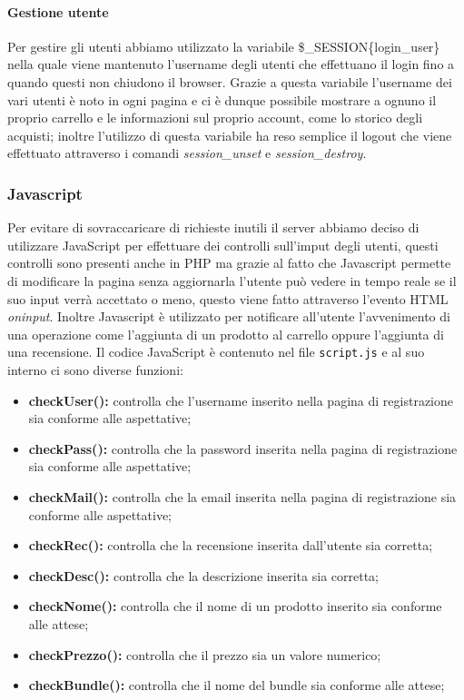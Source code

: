 \paragraph{Gestione utente} \Spazio
Per gestire gli utenti abbiamo utilizzato la variabile \$\_SESSION\{login\_user\} nella quale viene mantenuto l'username degli utenti che effettuano il login fino a quando questi non chiudono il browser.\newline
Grazie a questa variabile l'username dei vari utenti è noto in ogni pagina e ci è dunque possibile mostrare a ognuno il proprio carrello e le informazioni sul proprio account, come lo storico degli acquisti;
inoltre l'utilizzo di questa variabile ha reso semplice il logout che viene effettuato attraverso i comandi \emph{session\_unset} e \emph{session\_destroy}.

\subsubsection{Javascript}
Per evitare di sovraccaricare di richieste inutili il server abbiamo deciso di utilizzare JavaScript per effettuare dei controlli sull'imput degli utenti, questi controlli sono presenti anche in PHP ma grazie al fatto che Javascript permette di modificare la pagina senza aggiornarla l'utente può vedere in tempo reale se il suo input verrà accettato o meno, questo viene fatto attraverso l'evento HTML \emph{oninput}.\newline
Inoltre Javascript è utilizzato per notificare all'utente l'avvenimento di una operazione come l'aggiunta di un prodotto al carrello oppure l'aggiunta di una recensione.\newline
Il codice JavaScript è contenuto nel file \texttt{script.js} e al suo interno ci sono diverse funzioni:
\begin{itemize}
	\item \textbf{checkUser():} controlla che l'username inserito nella pagina di registrazione sia conforme alle aspettative;
	\item \textbf{checkPass():} controlla che la password inserita nella pagina di registrazione sia conforme alle aspettative;
	\item \textbf{checkMail():} controlla che la email inserita nella pagina di registrazione sia conforme alle aspettative;
	\item \textbf{checkRec():} controlla che la recensione inserita dall'utente sia corretta;
	\item \textbf{checkDesc():} controlla che la descrizione inserita sia corretta;
	\item \textbf{checkNome():} controlla che il nome di un prodotto inserito sia conforme alle attese;
	\item \textbf{checkPrezzo():} controlla che il prezzo sia un valore numerico;
	\item \textbf{checkBundle():} controlla che il nome del bundle sia conforme alle attese;
\end{itemize}



